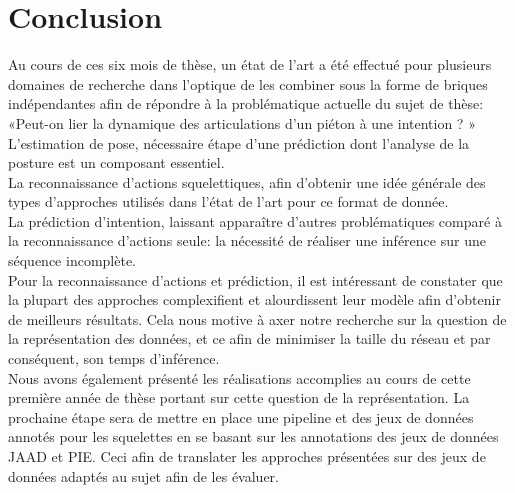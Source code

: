 \clearpage
\chapter{Conclusion}
\label{sec:SOTA}

Au cours de ces six mois de thèse, un état de l'art a été effectué pour plusieurs domaines de recherche dans l'optique de les combiner sous la forme de briques indépendantes afin de répondre à la problématique actuelle du sujet de thèse: «Peut-on lier la dynamique des articulations d'un piéton à une intention ? »\\

L'estimation de pose, nécessaire étape d'une prédiction dont l'analyse de la posture est un composant essentiel.\\
La reconnaissance d'actions squelettiques, afin d'obtenir une idée générale des types d'approches utilisés dans l'état de l'art pour ce format de donnée.\\
La prédiction d'intention, laissant apparaître d'autres problématiques comparé à la reconnaissance d'actions seule: la nécessité de réaliser une inférence sur une séquence incomplète.\\

Pour la reconnaissance d'actions et prédiction, il est intéressant de constater que la plupart des approches complexifient et alourdissent leur modèle afin d'obtenir de meilleurs résultats. Cela nous motive à axer notre recherche sur la question de la représentation des données, et ce afin de minimiser la taille du réseau et par conséquent, son temps d'inférence.\\

Nous avons également présenté les réalisations accomplies au cours de cette première année de thèse portant sur cette question de la représentation. La prochaine étape sera de mettre en place une pipeline et des jeux de données annotés pour les squelettes en se basant sur les annotations des jeux de données JAAD et PIE. Ceci afin de translater les approches présentées sur des jeux de données adaptés au sujet afin de les évaluer.